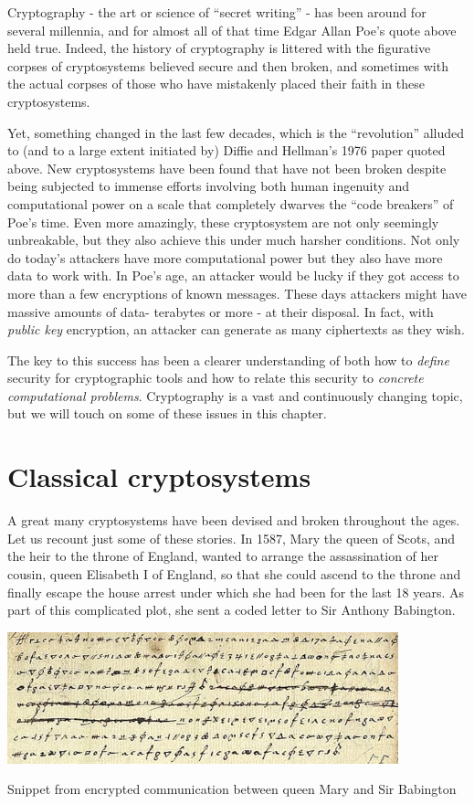 Cryptography - the art or science of ``secret writing'' - has been
around for several millennia, and for almost all of that time Edgar
Allan Poe's quote above held true. Indeed, the history of cryptography
is littered with the figurative corpses of cryptosystems believed secure
and then broken, and sometimes with the actual corpses of those who have
mistakenly placed their faith in these cryptosystems.

Yet, something changed in the last few decades, which is the
``revolution'' alluded to (and to a large extent initiated by) Diffie
and Hellman's 1976 paper quoted above. New cryptosystems have been found
that have not been broken despite being subjected to immense efforts
involving both human ingenuity and computational power on a scale that
completely dwarves the ``code breakers'' of Poe's time. Even more
amazingly, these cryptosystem are not only seemingly unbreakable, but
they also achieve this under much harsher conditions. Not only do
today's attackers have more computational power but they also have more
data to work with. In Poe's age, an attacker would be lucky if they got
access to more than a few encryptions of known messages. These days
attackers might have massive amounts of data- terabytes or more - at
their disposal. In fact, with \emph{public key} encryption, an attacker
can generate as many ciphertexts as they wish.

The key to this success has been a clearer understanding of both how to
\emph{define} security for cryptographic tools and how to relate this
security to \emph{concrete computational problems}. Cryptography is a
vast and continuously changing topic, but we will touch on some of these
issues in this chapter.

\section{Classical cryptosystems}\label{Classical-cryptosystems}

A great many cryptosystems have been devised and broken throughout the
ages. Let us recount just some of these stories. In 1587, Mary the queen
of Scots, and the heir to the throne of England, wanted to arrange the
assassination of her cousin, queen Elisabeth I of England, so that she
could ascend to the throne and finally escape the house arrest under
which she had been for the last 18 years. As part of this complicated
plot, she sent a coded letter to Sir Anthony Babington.


\begin{marginfigure}
\centering
\includegraphics[width=\linewidth, height=1.5in, keepaspectratio]{../figure/encrypted_letter.jpg}
\caption{Snippet from encrypted communication between queen Mary and Sir
Babington}
\label{maryscottletterfig}
\end{marginfigure}

